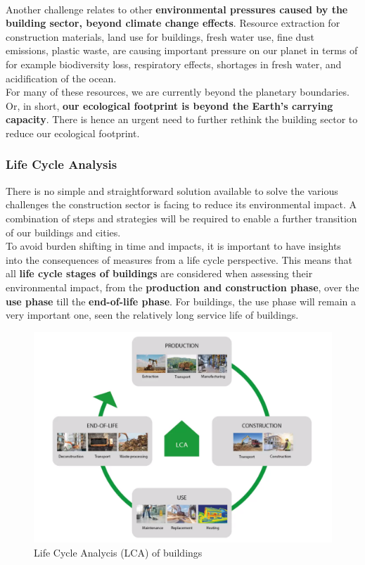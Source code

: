 \documentclass[../summary.tex]{subfiles}
\begin{document}
	\ \\
	Another challenge relates to other \textbf{environmental pressures caused by the building sector, beyond climate change effects}. Resource extraction for construction materials, land use for buildings, fresh water use, fine dust emissions, plastic waste, are causing important pressure on our planet in terms of for example biodiversity loss, respiratory effects, shortages in fresh water, and acidification of the ocean. 
	\\
	For many of these resources, we are currently beyond the planetary boundaries. Or, in short, \textbf{our ecological footprint is beyond the Earth’s carrying capacity}. There is hence an urgent need to further rethink the building sector to reduce our ecological footprint. 
	
	\subsubsection{Life Cycle Analysis}
	
	There is no simple and straightforward solution available to solve the various challenges the construction sector is facing to reduce its environmental impact. A combination of steps and strategies will be required to enable a further transition of our buildings and cities.
	\\
	To avoid burden shifting in time and impacts, it is important to have insights into the consequences of measures from a life cycle perspective. This means that all \textbf{life cycle stages of buildings} are considered when assessing their environmental impact, from the \textbf{production and construction phase}, over the \textbf{use phase} till the \textbf{end-of-life phase}. For buildings, the use phase will remain a very important one, seen the relatively long service life of buildings.
	
	\begin{figure}[H]
		\centering
		\includegraphics[width=0.68\linewidth]{../images/8-LCA}
		\caption{Life Cycle Analycis (LCA) of buildings}
		\label{fig:8-lca}
	\end{figure}
	
\end{document}
